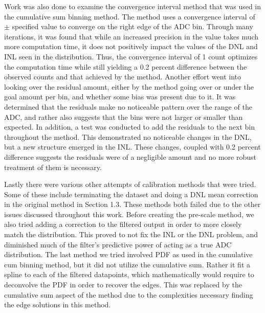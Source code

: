 \documentclass[11pt, letterpaper]{article}
\begin{document}
Work was also done to examine the convergence interval method that was used in the cumulative sum binning method. 
The method uses a convergence interval of $\pm$ specified value to converge on the right edge of the ADC bin. 
Through many iterations, it was found that while an increased precision in the value takes much more computation time, it does not positively impact the values of the DNL and INL seen in the distribution. 
Thus, the convergence interval of 1 count optimizes the computation time while still yielding a 0.2 percent difference between the observed counts and that achieved by the method. 
Another effort went into looking over the residual amount, either by the method going over or under the goal amount per bin, and whether some bias was present due to it. 
It was determined that the residuals make no noticeable pattern over the range of the ADC, and rather also suggests that the bins were not larger or smaller than expected. 
In addition, a test was conducted to add the residuals to the next bin throughout the method. 
This demonstrated no noticeable changes in the DNL, but a new structure emerged in the INL. 
These changes, coupled with 0.2 percent difference suggests the residuals were of a negligible amount and no more robust treatment of them is necessary. 
\indent 


Lastly there were various other attempts of calibration methods that were tried. 
Some of these include terminating the dataset and doing a DNL mean correction in the original method in Section 1.3. 
These methods both failed due to the other issues discussed throughout this work. 
Before creating the pre-scale method, we also tried adding a correction to the filtered output in order to more closely match the distribution. 
This proved to not fix the INL or the DNL problem, and diminished much of the filter's predictive power of acting as a true ADC distribution.
The last method we tried involved PDF as used in the cumulative cum binning method, but it did not utilize the cumulative sum. 
Rather it fit a spline to each of the filtered datapoints, which mathematically would require to deconvolve the PDF in order to recover the edges. 
This was replaced by the cumulative sum aspect of the method due to the complexities necessary finding the edge solutions in this method. 
\end{document}
